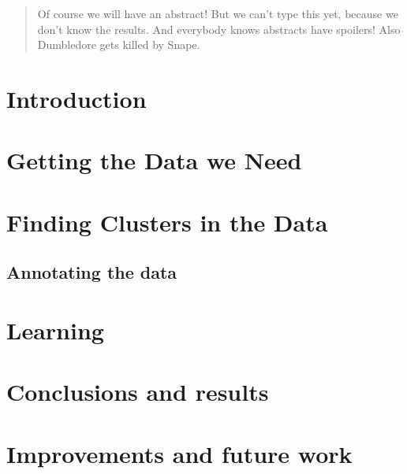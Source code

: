\documentclass[a4paper, 11pt]{article}
\begin{document}

\vspace*{00mm}
\tableofcontents
\newpage






\begin{abstract}
Of course we will have an abstract! But we can't type this yet, because we don't
know the results. And everybody knows abstracts have spoilers! Also Dumbledore
gets killed by Snape.
\end{abstract}
\section{Introduction}

\section{Getting the Data we Need}
 
\section{Finding Clusters in the Data}
 
 \subsection{Annotating the data}


\section{Learning}

\section{Conclusions and results}

\section{Improvements and future work}
\end{document}
